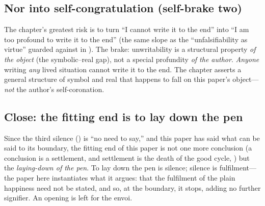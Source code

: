\subsection{Nor into self-congratulation (self-brake two)}
\label{p19:sub:unwrit-brake2}

The chapter's greatest risk is to turn ``I cannot write it to the end'' into ``I am too profound to write it to the end'' (the same slope as the ``unfalsifiability as virtue'' guarded against in ). The brake: unwritability is a structural property \emph{of the object} (the symbolic--real gap), not a special profundity \emph{of the author}. \emph{Anyone} writing \emph{any} lived situation cannot write it to the end. The chapter asserts a general structure of symbol and real that happens to fall on this paper's object---\emph{not} the author's self-coronation.

\subsection{Close: the fitting end is to lay down the pen}
\label{p19:sub:unwrit-close}

Since the third silence () is ``no need to say,'' and this paper has said what can be said to its boundary, the fitting end of this paper is not one more conclusion (a conclusion is a settlement, and settlement is the death of the good cycle, ) but the \emph{laying-down of the pen}. To lay down the pen is silence; silence is fulfilment---the paper here instantiates what it argues: that the fulfilment of the plain happiness need not be stated, and so, at the boundary, it stops, adding no further signifier. An opening is left for the envoi.

